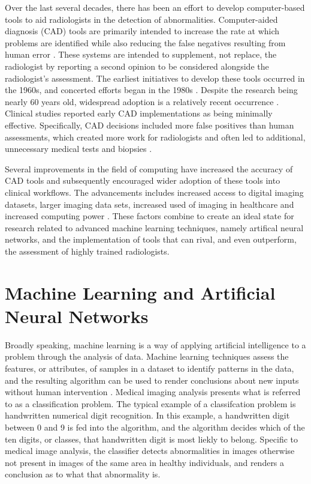 \documentclass[sigconf]{acmart}
\begin{document}
Over the last several decades, there has been an effort to develop computer-based tools to aid radiologists in the detection of abnormalities. Computer-aided diagnosis (CAD) tools are primarily intended to increase the rate at which problems are identified while also reducing the false negatives resulting from human error \cite{cite06} . These systems are intended to supplement, not replace, the radiologist by reporting a second opinion to be considered alongside the radiologist's assessment. The earliest initiatives to develop these tools occurred in the 1960s, and concerted efforts began in the 1980s \cite{cite02}. Despite the research being nearly 60 years old, widespread adoption is a relatively recent occurrence \cite{cite03}. Clinical studies reported early CAD implementations as being minimally effective. Specifically, CAD decisions included more false positives than human assessments, which created more work for radiologists and often led to additional, unnecessary medical tests and biopsies \cite{cite05}.

Several improvements in the field of computing have increased the accuracy of CAD tools and subsequently encouraged wider adoption of these tools into clinical workflows. The advancements includes increased access to digital imaging datasets, larger imaging data sets, increased used of imaging in healthcare and increased computing power \cite{cite03}\cite{cite05}. These factors combine to create an ideal state for research related to advanced machine learning techniques, namely artifical neural networks, and the implementation of tools that can rival, and even outperform, the assessment of highly trained radiologists.

\section{Machine Learning and Artificial Neural Networks}

Broadly speaking, machine learning is a way of applying artificial intelligence to a problem through the analysis of data. Machine learning techniques assess the features, or attributes, of samples in a dataset to identify patterns in the data, and the resulting algorithm can be used to render conclusions about new inputs without human intervention \cite{cite05}. Medical imaging analysis presents what is referred to as a classification problem. The typical example of a classifcation problem is handwritten numerical digit recognition. In this example, a handwritten digit between 0 and 9 is fed into the algorithm, and the algorithm decides which of the ten digits, or classes, that handwritten digit is most liekly to belong. Specific to medical image analysis, the classifier detects abnormalities in images otherwise not present in images of the same area in healthy individuals, and renders a conclusion as to what that abnormality is.
\end{document}
